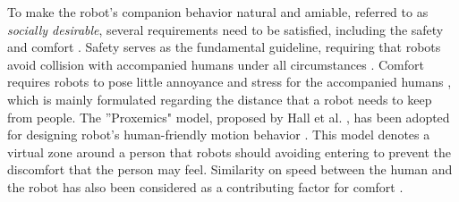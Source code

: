 \documentclass[letterpaper, 10 pt, conference]{ieeeconf}
\newcommand{\todohere}[1]{\hl{(\textbf{TODO:} #1)}}
\begin{document}
	To make the robot's companion behavior natural and amiable, referred to as \textit{socially desirable}, several requirements need to be satisfied, including the safety and comfort \cite{kruse2013human}.
	Safety serves as the fundamental guideline, requiring that robots avoid collision with accompanied humans under all circumstances \cite{svenstrup2010trajectory}. %
	Comfort requires robots to pose little annoyance and stress for the accompanied humans \cite{kruse2013human}, which is mainly formulated regarding the distance that a robot needs to keep from people.
	The ''Proxemics" model, proposed by Hall et al. \cite{hall1968proxemics}, has been adopted for designing robot's human-friendly motion behavior \cite{barnaud2014proxemics}. %
	This model denotes a virtual zone around a person that robots should avoiding entering to prevent the discomfort that the person may feel.
	Similarity on speed between the human and the robot has also been considered as a contributing factor for comfort \cite{henry2010learning}.
	
	
\end{document}
